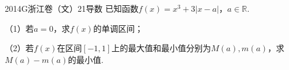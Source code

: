 
\begin{problem}{2014}{G}{浙江卷（文）}{21}{导数}
已知函数$f(x)=x^3+3|x-a|$，$a\in\mathbb{R}$.

（1）若$a=0$，求$f(x)$的单调区间；

（2）若$f(x)$在区间$[-1,1]$上的最大值和最小值分别为$M(a),m(a)$，求$M(a)-m(a)$的最小值.
\end{problem}